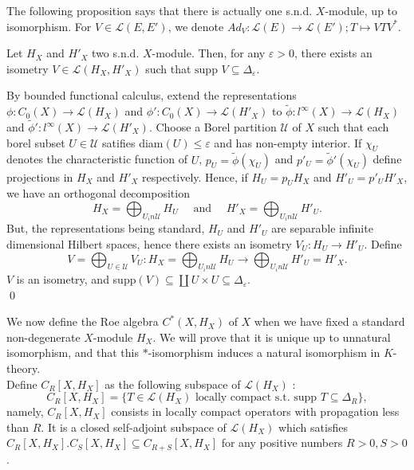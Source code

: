 The following proposition says that there is actually one s.n.d. $X$-module, up to isomorphism. For $V\in\mathcal L(E,E')$, we denote $Ad_V : \mathcal L(E) \rightarrow \mathcal L(E') ; T\mapsto VTV^*$.

\begin{prop}\label{SND}
Let $H_X$ and $H'_X$ two s.n.d. $X$-module. Then, for any $\varepsilon>0$, there exists an isometry $V\in\mathcal L(H_X,H'_X)$ such that $\text{supp }V \subseteq \Delta_\varepsilon$.
\end{prop}

\begin{dem}
By bounded functional calculus, extend the representations $\phi : C_0(X)\rightarrow \mathcal L(H_X)$ and $\phi' : C_0(X)\rightarrow \mathcal L(H'_X)$ to $\tilde \phi : l^\infty(X)\rightarrow \mathcal L(H_X) $ and $\tilde \phi' : l^\infty(X)\rightarrow \mathcal L(H'_X) $. Choose a Borel partition $\mathcal U$ of $X$ such that each borel subset $U\in\mathcal U$ satifies diam$(U)\leq \varepsilon $ and has non-empty interior. If $\chi_U$ denotes the characteristic function of $U$, $p_U = \tilde\phi(\chi_U)$ and $p'_{U}=\tilde\phi'(\chi_U)$ define projections in $H_X$ and $H'_X$ respectively. Hence, if $H_U = p_U H_X$ and $H'_U= p'_U H'_X$, we have an orthogonal decomposition 
\[H_X = \bigoplus_{U_in\mathcal U} H_U \quad  \text{ and } \quad H'_X = \bigoplus_{U_in\mathcal U} H'_U.\]
But, the representations being standard, $H_U$ and $H'_U$ are separable infinite dimensional Hilbert spaces, hence there exists an isometry $V_U : H_U\rightarrow H'_U$. Define 
\[V = \bigoplus_{U\in\mathcal U} V_U : H_X = \bigoplus_{U_in\mathcal U} H_U \rightarrow  \bigoplus_{U_in\mathcal U} H'_U = H'_X.  \]
$V$ is an isometry, and supp$(V)\subseteq \coprod U\times U \subseteq \Delta_\varepsilon$.\\
\qed
\end{dem}

We now define the Roe algebra $C^*(X, H_X)$ of $X$ when we have fixed a standard non-degenerate $X$-module $H_X$. We will prove that it is unique up to unnatural isomorphism, and that this $*$-isomorphism induces a natural isomorphism in $K$-theory.\\

Define $C_R[X,H_X]$ as the following subspace of $\mathcal L(H_X)$ :
\[C_R[X,H_X] = \{T\in \mathcal L(H_X) \text{ locally compact  s.t. supp }T\subseteq \Delta_R \},\]
namely, $C_R[X,H_X]$ consists in locally compact operators with propagation less than $R$. It is a closed self-adjoint subspace of $\mathcal L(H_X)$ which satisfies $C_R[X,H_X].C_S[X,H_X]\subseteq C_{R+S}[X,H_X]$ for any positive numbers $R>0,S>0$.\\

